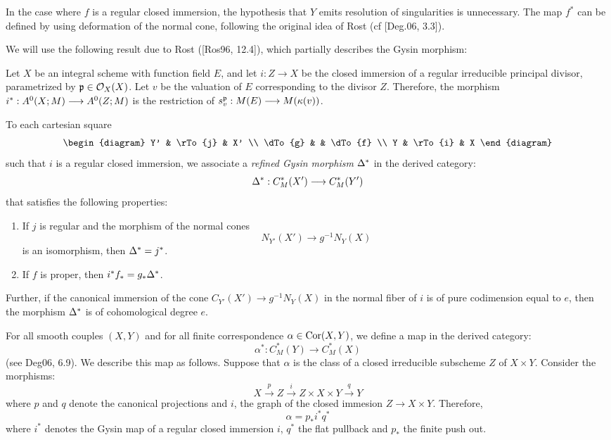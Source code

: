 In the case where $f$ is a regular closed immersion, the 
hypothesis that $Y$ emits resolution of singularities is 
unnecessary. The map $f^*$ can be defined by using deformation
of the normal cone, following the original idea of Rost (cf 
[Deg.06, 3.3]).

We will use the following result due to Rost ([Ros96, 12.4]),
which partially describes the Gysin morphism:

\begin{prop}
Let $X$ be an integral scheme with function field $E$, and let $i: 
Z \to X$ be the closed immersion of a regular irreducible 
principal divisor, parametrized by $\mathfrak{p} \in \mathcal{O}_X(X)$. Let 
$v$ be the valuation of $E$ corresponding to the divisor $Z$. 
Therefore, the morphism $i^*: A^0(X; M) \longrightarrow A^0(Z; 
M)$ is the restriction of $s_{v}^{\mathfrak{p}}: M(E) \longrightarrow 
M(\kappa(v))$.
\end{prop}

To each cartesian square
\[
\begin{diagram}
Y'      & \rTo{j} & X'      \\
\dTo{g} &         & \dTo{f} \\
Y       & \rTo{i} & X
\end{diagram}
\]
such that $i$ is a regular closed immersion, we associate a 
\emph{refined Gysin morphism} $\Delta^*$ in the derived 
category:
\[
\Delta^*: C_M^*(X') \longrightarrow C_M^*(Y')
\]
that satisfies the following properties:
\begin{enumerate}
\item If $j$ is regular and the morphism of the normal cones
\[
N_{Y'}(X') \to g^{-1}N_Y(X)
\] 
is an isomorphism, then $\Delta^* = j^*$.

\item If $f$ is proper, then $i^*f_* = g_*\Delta^*$.
\end{enumerate}

Further, if the canonical immersion of the cone $C_{Y'}(X') \to
g^{-1}N_Y(X)$ in the normal fiber of $i$ is of pure codimension
equal to $e$, then the morphism $\Delta^*$ is of cohomological
degree $e$.

For all smooth couples $(X, Y)$ and for all finite correspondence
$\alpha \in \mathrm{Cor}(X, Y)$, we define a map in the derived category:
\[
\alpha^* : C_M^*(Y) \to C_M^*(X)
\]
(see Deg06, 6.9). We describe this map as follows. Suppose that 
$\alpha$ is the class of a closed irreducible subscheme $Z$ of $X 
\times Y$. Consider the morphisms:
\[
X \stackrel{p}{\rightarrow} Z \stackrel{i}{\to} Z \times X \times Y
\stackrel{q}{\to} Y
\]
where $p$ and $q$ denote the canonical projections and $i$, the
graph of the closed immesion $Z \to X \times Y$. Therefore,
\begin{equation}
\alpha = p_* i^*q^*
\end{equation}
where $i^*$ denotes the Gysin map of a regular closed immersion 
$i$, $q^*$ the flat pullback and $p_*$ the finite push out.

